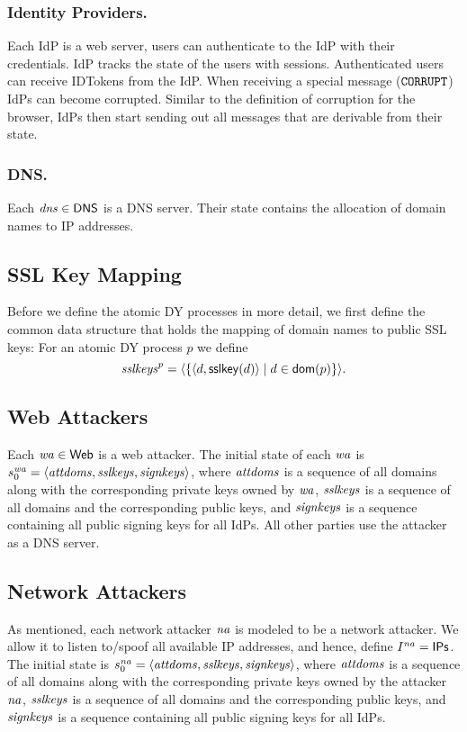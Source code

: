 \documentclass[letterpaper,onecolumn,10pt]{article}
\begin{document}
\subsubsection{Identity Providers.} Each IdP is a web server, 
users can authenticate to the IdP with their credentials. 
IdP tracks the state of the users with sessions. 
Authenticated users can receive IDTokens from the IdP. 
When receiving a special message ($\mathtt{CORRUPT}$) IdPs can become corrupted. 
Similar to the definition of corruption for the browser,
IdPs then start sending out all messages that are derivable from their state.

\subsubsection{DNS.} Each $\mathit{dns} \in \mathsf{DNS}$ is a DNS server.
Their state contains the allocation of domain names to IP addresses.

\subsection{SSL Key Mapping}\label{app:common-data-structures}
Before we define the atomic DY processes in more detail, we first
define the common data structure that holds the mapping of domain
names to public SSL keys: For an atomic DY process $p$ we define
\[\mathit{sslkeys}^p = \langle\left\{\langle d, \mathsf{sslkey}(d)\rangle \mid d \in \mathsf{dom}(p)\right\}\rangle.\]

\subsection{Web Attackers}\label{app:webattackers-uppresso}
Each $\mathit{wa} \in \mathsf{Web}$ is a web attacker. The initial state of each $\mathit{wa}$ is $s_0^{\mathit{wa}} =
\langle\mathit{attdoms}, \mathit{sslkeys}, \mathit{signkeys}\rangle$, where $\mathit{attdoms}$
is a sequence of all domains along with the corresponding private keys
owned by $\mathit{wa}$, $\mathit{sslkeys}$ is a sequence of all domains and
the corresponding public keys, and $\mathit{signkeys}$ is a sequence
containing all public signing keys for all IdPs. All other parties use
the attacker as a DNS server.

\subsection{Network Attackers}\label{app:networkattackers-uppresso}
As mentioned, each network attacker $\mathit{na}$ is modeled to be a network attacker. 
We allow it to listen to/spoof all available IP addresses, and hence, 
define $I^{\mathit{na}} = \mathsf{IPs}$. The initial state is $s_0^{\mathit{na}} =
\langle\mathit{attdoms}, \mathit{sslkeys}, \mathit{signkeys}\rangle$, where $\mathit{attdoms}$
is a sequence of all domains along with the corresponding private keys
owned by the attacker $\mathit{na}$, $\mathit{sslkeys}$ is a sequence of all domains 
and the corresponding public keys, and $\mathit{signkeys}$ is a sequence
containing all public signing keys for all IdPs.
\end{document}
